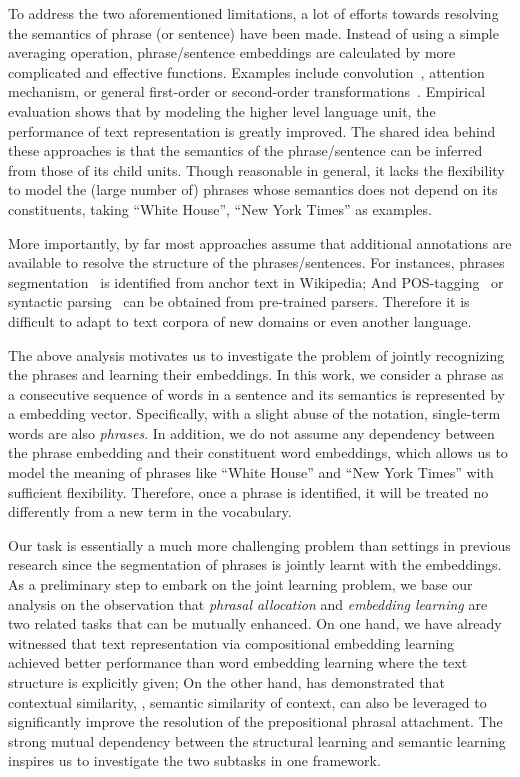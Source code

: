 To address the two aforementioned limitations, a lot of efforts towards
resolving the semantics of phrase (or sentence) have been made. Instead of using
a simple averaging operation, phrase/sentence embeddings are calculated by more
complicated and effective functions. Examples include
convolution~\cite{kim2014convolutional}, attention mechanism, or general
first-order or second-order
transformations~\cite{le2015compositional,irsoy2014deep}. Empirical evaluation
shows that by modeling the higher level language unit, the performance of text
representation is greatly improved. The shared idea behind these approaches is
that the semantics of the phrase/sentence can be inferred from those of its
child units. Though reasonable in general, it lacks the
flexibility to model the (large number of) phrases whose semantics does not
depend on its constituents, taking ``White House'', ``New York Times'' as
examples.

More importantly, by far most approaches assume that additional annotations are
available to resolve the structure of the phrases/sentences. For instances,
phrases segmentation~\cite{yin2014exploration} is identified from anchor text in
Wikipedia; And POS-tagging~\cite{zhao2015phrase,baroni2010nouns} or syntactic
parsing~\cite{levy2014dependency,yu2015learning,socher2013parsing} can be
obtained from pre-trained parsers. Therefore it is difficult to adapt to text
corpora of new domains or even another language.

The above analysis motivates us to investigate the problem of jointly
recognizing the phrases and learning their embeddings. In this work, we consider
a phrase as a consecutive sequence of words in a sentence and its semantics is
represented by a embedding vector. Specifically, with a slight abuse of the
notation, single-term words are also \emph{phrases}. In addition, we do not
assume any dependency between the phrase embedding and their constituent word
embeddings, which allows us to model the meaning of phrases like ``White House''
and ``New York Times'' with sufficient flexibility. Therefore, once a phrase is
identified, it will be treated no differently from a new term in the vocabulary.

Our task is essentially a much more challenging problem than settings in
previous research since the segmentation of phrases is jointly learnt with the
embeddings. As a preliminary step to embark on the joint learning problem, we
base our analysis on the observation that \emph{phrasal allocation} and
\emph{embedding learning} are two related tasks that can be mutually enhanced.
On one hand, we have already witnessed that text representation via
compositional embedding
learning~\cite{levy2014dependency,yu2015learning,socher2013parsing} achieved
better performance than word embedding learning where the text structure is
explicitly given; On the other hand,
\cite{pantel2000unsupervised,collins1995prepositional} has demonstrated that
contextual similarity, \ie, semantic similarity of context, can also be
leveraged to significantly improve the resolution of the prepositional phrasal
attachment. The strong mutual dependency between the structural learning and
semantic learning inspires us to investigate the two subtasks in one framework.

